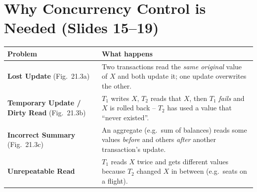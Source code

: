 \documentclass[10pt,a4paper]{article}
\begin{document}
\section{Why Concurrency Control is Needed (Slides 15--19)}

\begin{tabularx}{\linewidth}{@{}>{\raggedright\arraybackslash}p{3.2cm} X@{}}
\toprule
\textbf{Problem} & \textbf{What happens}\\\midrule
\textbf{Lost Update} (Fig.~21.3a) & Two transactions read the \emph{same original} value of $X$ and both update it; one update overwrites the other.\\
\textbf{Temporary Update / Dirty Read} (Fig.~21.3b) & $T_1$ writes $X$, $T_2$ reads that $X$, then $T_1$ \emph{fails} and $X$ is rolled back -- $T_2$ has used a value that ``never existed''.\\
\textbf{Incorrect Summary} (Fig.~21.3c) & An aggregate (e.g.\ sum of balances) reads some values \emph{before} and others \emph{after} another transaction's update.\\
\textbf{Unrepeatable Read} & $T_1$ reads $X$ twice and gets different values because $T_2$ changed $X$ in between (e.g.\ seats on a flight).\\
\bottomrule
\end{tabularx}
\end{document}
